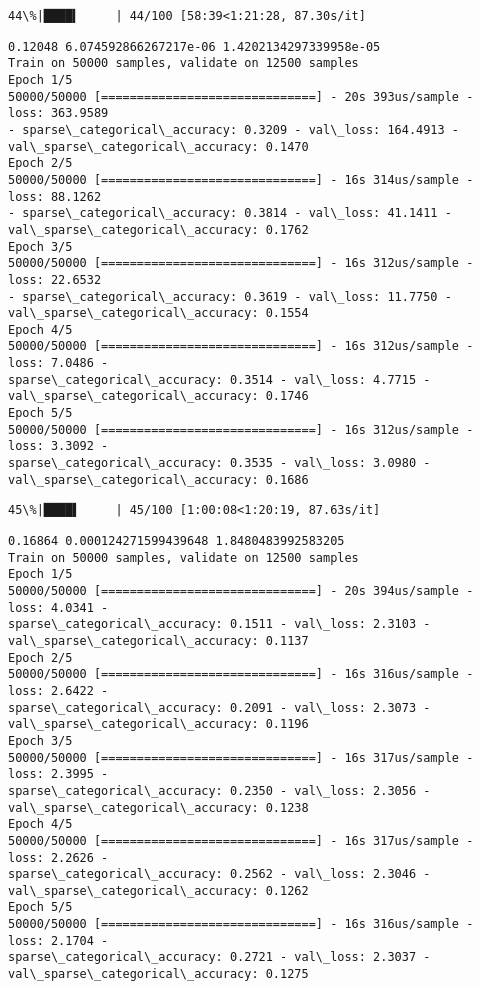 \documentclass[11pt]{article}
\begin{document}
    \begin{Verbatim}[commandchars=\\\{\}]
 44\%|████▍     | 44/100 [58:39<1:21:28, 87.30s/it]
    \end{Verbatim}

    \begin{Verbatim}[commandchars=\\\{\}]
0.12048 6.074592866267217e-06 1.4202134297339958e-05
Train on 50000 samples, validate on 12500 samples
Epoch 1/5
50000/50000 [==============================] - 20s 393us/sample - loss: 363.9589
- sparse\_categorical\_accuracy: 0.3209 - val\_loss: 164.4913 -
val\_sparse\_categorical\_accuracy: 0.1470
Epoch 2/5
50000/50000 [==============================] - 16s 314us/sample - loss: 88.1262
- sparse\_categorical\_accuracy: 0.3814 - val\_loss: 41.1411 -
val\_sparse\_categorical\_accuracy: 0.1762
Epoch 3/5
50000/50000 [==============================] - 16s 312us/sample - loss: 22.6532
- sparse\_categorical\_accuracy: 0.3619 - val\_loss: 11.7750 -
val\_sparse\_categorical\_accuracy: 0.1554
Epoch 4/5
50000/50000 [==============================] - 16s 312us/sample - loss: 7.0486 -
sparse\_categorical\_accuracy: 0.3514 - val\_loss: 4.7715 -
val\_sparse\_categorical\_accuracy: 0.1746
Epoch 5/5
50000/50000 [==============================] - 16s 312us/sample - loss: 3.3092 -
sparse\_categorical\_accuracy: 0.3535 - val\_loss: 3.0980 -
val\_sparse\_categorical\_accuracy: 0.1686
    \end{Verbatim}

    \begin{Verbatim}[commandchars=\\\{\}]
 45\%|████▌     | 45/100 [1:00:08<1:20:19, 87.63s/it]
    \end{Verbatim}

    \begin{Verbatim}[commandchars=\\\{\}]
0.16864 0.000124271599439648 1.8480483992583205
Train on 50000 samples, validate on 12500 samples
Epoch 1/5
50000/50000 [==============================] - 20s 394us/sample - loss: 4.0341 -
sparse\_categorical\_accuracy: 0.1511 - val\_loss: 2.3103 -
val\_sparse\_categorical\_accuracy: 0.1137
Epoch 2/5
50000/50000 [==============================] - 16s 316us/sample - loss: 2.6422 -
sparse\_categorical\_accuracy: 0.2091 - val\_loss: 2.3073 -
val\_sparse\_categorical\_accuracy: 0.1196
Epoch 3/5
50000/50000 [==============================] - 16s 317us/sample - loss: 2.3995 -
sparse\_categorical\_accuracy: 0.2350 - val\_loss: 2.3056 -
val\_sparse\_categorical\_accuracy: 0.1238
Epoch 4/5
50000/50000 [==============================] - 16s 317us/sample - loss: 2.2626 -
sparse\_categorical\_accuracy: 0.2562 - val\_loss: 2.3046 -
val\_sparse\_categorical\_accuracy: 0.1262
Epoch 5/5
50000/50000 [==============================] - 16s 316us/sample - loss: 2.1704 -
sparse\_categorical\_accuracy: 0.2721 - val\_loss: 2.3037 -
val\_sparse\_categorical\_accuracy: 0.1275
    \end{Verbatim}
\end{document}

